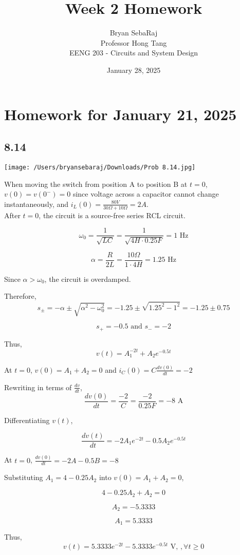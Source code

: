 \documentclass{article}
\title{Week 2 Homework}
\author{Bryan SebaRaj \\[0.7em] Professor Hong Tang \\[0.7em]  EENG 203 - Circuits and System Design}
\date{January 28, 2025}
\begin{document}
\maketitle

\section*{Homework for January 21, 2025}

\subsection*{8.14}

\texttt{[image: /Users/bryansebaraj/Downloads/Prob 8.14.jpg]}

When moving the switch from position A to position B at $t=0$, $v(0)=v(0^-)=0$ since voltage across a capacitor cannot change instantaneously, and $i_L(0)=\frac{80 V}{30 \Omega + 10 \Omega}=2 A$. \\

After $t=0$, the circuit is a source-free series RCL circuit. 

$$\omega_0 = \frac{1}{\sqrt{LC}}=\frac{1}{\sqrt{4 H \cdot 0.25 F}}=1 \text{ Hz}$$

$$\alpha = \frac{R}{2L}=\frac{10 \Omega}{1 \cdot 4 H}=1.25 \text{ Hz}$$

Since $\alpha > \omega_0$, the circuit is overdamped.

Therefore, $$s_{\pm}= - \alpha \pm \sqrt{\alpha^2 - \omega^2_0}=-1.25 \pm \sqrt{1.25^2 - 1^2}=-1.25 \pm 0.75$$

$$s_{+} = -0.5 \text{ and } s_{-} = -2$$

Thus, $$v(t)=A_1^{-2t} + A_2e^{-0.5t}$$

At $t=0$, $v(0)=A_1+A_2=0$ and $i_C(0)=C\frac{dv(0)}{dt}=-2$

Rewriting in terms of $\frac{dv}{dt}$, $$\frac{dv(0)}{dt}=\frac{-2}{C}=\frac{-2}{0.25 F} = -8 \text{ A}$$

Differentiating $v(t)$,

$$\frac{dv(t)}{dt}=-2A_1e^{-2t} - 0.5A_2e^{-0.5t}$$

At $t=0$, $\frac{dv(0)}{dt}=-2A-0.5B=-8$

Substituting $A_1 = 4 - 0.25 A_2$ into $v(0)= A_1+A_2 = 0$, 

$$4 - 0.25A_2 + A_2 = 0$$

$$A_2 = -5.3333$$

$$A_1 = 5.3333$$

Thus, $$v(t) = 5.3333 e^{-2t} - 5.3333 e^{-0.5t} \text{ V, }, \forall t \geq 0$$
\end{document}

